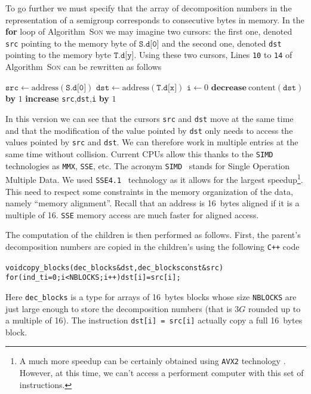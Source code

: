 \documentclass[reqno,11pt]{amsart}
\theoremstyle{plain}
\theoremstyle{definition}
\newcommand{\CPP}{\texttt{C++}\xspace}
\renewcommand{\leq}{\leqslant}
\newcommand{\MMX}{\texttt{MMX}\xspace}
\newcommand{\SIMD}{\texttt{SIMD}\xspace}
\newcommand{\SSE}{\texttt{SSE}\xspace}
\newcommand{\SSEV}{\texttt{SSE4.1}\xspace}
\renewcommand{\tt}[1]{\texttt{#1}}
\begin{document}
To go further we must specify that the array of decomposition numbers in the
representation of a semigroup corresponds to consecutive bytes in memory. In
the \textbf{for} loop of Algorithm~\textsc{Son} we may imagine two cursors:
the first one, denoted \texttt{src} pointing to the memory byte of
$\texttt{S.d[0]}$ and the second one, denoted \texttt{dst} pointing to the
memory byte $\texttt{T.d[y]}$.  Using these two cursors, Lines \tt{10} to
\tt{14} of Algorithm~\textsc{Son} can be rewritten as follows

{\small
\begin{algorithmic}
\State $\tt{src}\gets \text{address}(\tt{S.d[0]})$
\State $\tt{dst}\gets \text{address}(\tt{T.d[x]})$
\State $\tt{i}\gets 0$
\While{$\tt{i}\leq \tt{3G}-\tt{x}$}
\If{$\text{content}(\tt{src})>0$}
\State $\textbf{decrease}\ \text{content}(\tt{dst})$ \textbf{by} $1$\EndIf
\State \textbf{increase} \tt{src},\tt{dst},\tt{i} \textbf{by} $1$

\EndWhile
\end{algorithmic}}

\noindent In this version we can see that the cursors \texttt{src} and
\texttt{dst} move at the same time and that the modification of the value
pointed by \texttt{dst} only needs to access the values pointed by \tt{src}
and \tt{dst}.  We can therefore work in multiple entries at the same time
without collision.  Current CPUs allow this thanks to the \SIMD technologies as
\MMX, \SSE, etc.  The acronym \SIMD~\cite{WikipediaSIMD} stands for Single Operation Multiple Data.  
We used \SSEV~\cite{WikipediaSSE, IntelSSE} technology as it allows for the largest speedup\footnote{A much more speedup can be certainly obtained using \texttt{AVX2} technology \cite{AVX2}. However, at this time, we can't access a performent computer with this set of instructions.}.  
This need to respect some constraints in the memory
organization of the data, namely ``memory alignment''. Recall that an address
is 16~bytes aligned if it is a multiple of 16. \SSE memory access are much
faster for aligned access.


The computation of the children is then performed as follows. First, the
parent's decomposition numbers are copied in the children's using the
following \CPP code
{
\small
\begin{alltt}
void copy_blocks(dec_blocks &dst, dec_blocks const &src) {
  for (ind_t i=0; i<NBLOCKS; i++) dst[i] = src[i];
}
\end{alltt}}
Here \tt{dec\_blocks} is a type for arrays of 16~bytes blocks whose size
\tt{NBLOCKS} are just large enough to store the decomposition numbers (that is
$3G$ rounded up to a multiple of 16). The instruction \tt{dst[i] = src[i]}
actually copy a full 16~bytes block.
\end{document}
